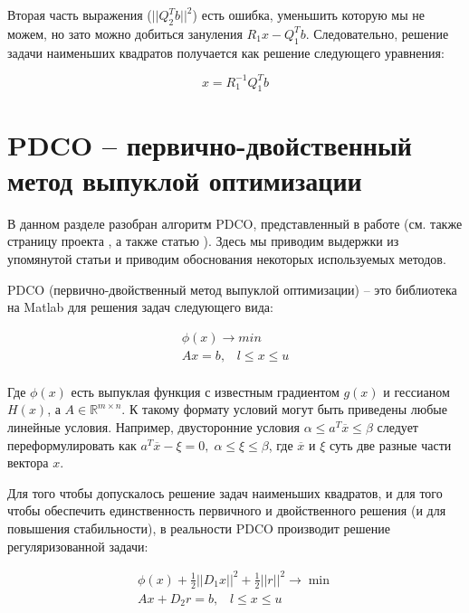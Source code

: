 \documentclass[a4paper, 12pt, titlepage]{article}
\theoremstyle{definition}
\theoremstyle{plain}
\theoremstyle{plain}
\begin{document}
Вторая часть выражения ($||Q_{2}^{T} b||^{2}$) есть ошибка, уменьшить которую
мы не можем, но зато можно добиться зануления $R_{1} x - Q_{1}^{T} b$.
Следовательно, решение задачи наименьших квадратов получается как решение
следующего уравнения:

\begin{equation}
 x = R_{1}^{-1} Q_{1}^{T} b
\end{equation}





\section{PDCO -- первично-двойственный метод выпуклой оптимизации}

В данном разделе разобран алгоритм PDCO, представленный в работе
\cite{Saunders2013} (см. также страницу проекта \cite{PDCO}, а также статью 
\cite{ChenDonohoSaunders2001}). Здесь мы приводим
выдержки из упомянутой статьи и приводим обоснования некоторых используемых 
методов.

PDCO (первично-двойственный метод выпуклой оптимизации) -- это библиотека на 
Matlab  для решения задач следующего вида:

\begin{equation}
 \begin{aligned}
 \phi(x) \to min \\
 Ax = b, \;\;\; l \leq x \leq u \\
 \end{aligned}
\end{equation}

Где $\phi(x)$ есть выпуклая функция с известным градиентом $g(x)$ и гессианом
$H(x)$, а $A \in \mathbb{R}^{m \times n}$. К такому формату условий могут быть 
приведены любые линейные условия. Например, двусторонние условия
$\alpha \leq a^{T} \overline{x} \leq \beta$ следует переформулировать как
$a^{T} \overline{x} - \xi = 0, \; \alpha \leq \xi \leq \beta$, где 
$\overline{x}$ и $\xi$ суть две разные части вектора $x$.

Для того чтобы допускалось решение задач наименьших квадратов, и для того чтобы
обеспечить единственность первичного и двойственного решения (и для повышения
стабильности), в реальности PDCO производит решение регуляризованной задачи:

\begin{equation}
 \begin{aligned}
  \phi(x) + \frac{1}{2}||D_{1} x||^{2} + \frac{1}{2}||r||^{2} \to \min \\
  A x + D_{2} r = b, \;\;\; l \leq x \leq u
 \end{aligned}
\end{equation}
\end{document}
